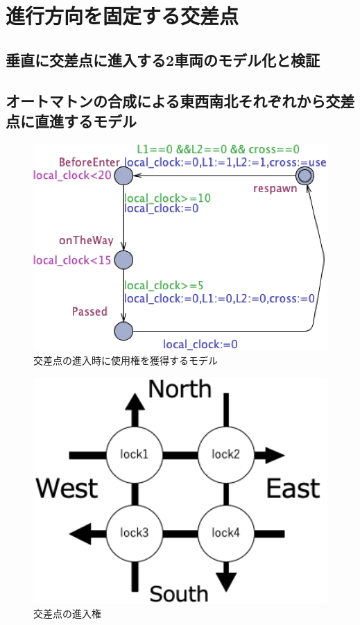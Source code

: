 \documentclass{tpu-sotu}
\begin{document}
	\section{進行方向を固定する交差点}
	\subsection{垂直に交差点に進入する2車両のモデル化と検証}
	\subsection{オートマトンの合成による東西南北それぞれから交差点に直進するモデル}
	
	\begin{figure}[htbp]
	\centering
	\includegraphics[width=140mm]{SimpleIntersection.png}
	\caption{交差点の進入時に使用権を獲得するモデル}
	\label{SI}
	\end{figure}
	\begin{figure}[htbp]
	\centering
	\includegraphics[width=130mm]{onTheWayofLock.png}
	\caption{交差点の進入権}
	\label{oTWoL}
	\end{figure}
\end{document}

